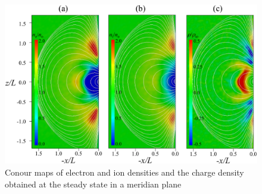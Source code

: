 \documentclass[draft,jgrga]{agutex2015}
\begin{document}
\begin{article}
\begin{figure}[t]
\centering
\noindent\includegraphics[width=15cm]{./figures/Fig_2_bb-crop.pdf}
\caption{Conour maps of electron and ion densities and the charge density 
obtained at the steady state in a meridian plane}\label{fig:2}
\end{figure}


\end{article}
\end{document}
